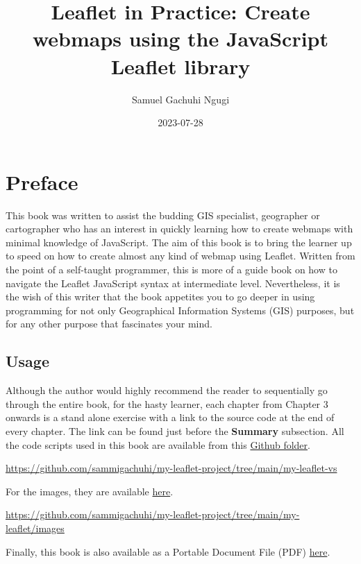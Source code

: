 \documentclass[
]{book}
\title{Leaflet in Practice: Create webmaps using the JavaScript Leaflet library}
\author{Samuel Gachuhi Ngugi}
\date{2023-07-28}
\begin{document}
\maketitle

{
\setcounter{tocdepth}{1}
\tableofcontents
}
\hypertarget{preface}{%
\chapter*{Preface}\label{preface}}

This book was written to assist the budding GIS specialist, geographer or cartographer who has an interest in quickly learning how to create webmaps with minimal knowledge of JavaScript. The aim of this book is to bring the learner up to speed on how to create almost any kind of webmap using Leaflet. Written from the point of a self-taught programmer, this is more of a guide book on how to navigate the Leaflet JavaScript syntax at intermediate level. Nevertheless, it is the wish of this writer that the book appetites you to go deeper in using programming for not only Geographical Information Systems (GIS) purposes, but for any other purpose that fascinates your mind.

\hypertarget{usage}{%
\section*{Usage}\label{usage}}

Although the author would highly recommend the reader to sequentially go through the entire book, for the hasty learner, each chapter from Chapter 3 onwards is a stand alone exercise with a link to the source code at the end of every chapter. The link can be found just before the \textbf{Summary} subsection. All the code scripts used in this book are available from this \href{https://github.com/sammigachuhi/my-leaflet-project/tree/main/my-leaflet-vs}{Github folder}.

\url{https://github.com/sammigachuhi/my-leaflet-project/tree/main/my-leaflet-vs}

For the images, they are available \href{https://github.com/sammigachuhi/my-leaflet-project/tree/main/my-leaflet/images}{here}.

\url{https://github.com/sammigachuhi/my-leaflet-project/tree/main/my-leaflet/images}

Finally, this book is also available as a Portable Document File (PDF) \href{https://github.com/sammigachuhi/my-leaflet-project/tree/main/my-leaflet/pdf_files}{here}.
\end{document}
